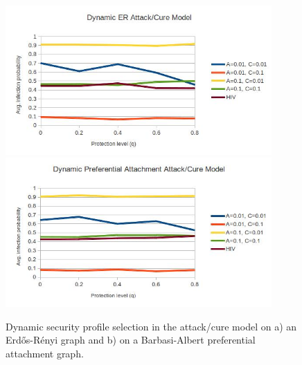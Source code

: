 \documentclass{article}
\theoremstyle{plain}
\begin{document}
\begin{figure}[h!]
  \centering
  \includegraphics[width=4in]{dynamic_er_attack_cure_model.jpg}
  \includegraphics[width=4in]{dynamic_preferential_attachment_attack_cure_model.jpg}
  \caption{Dynamic security profile selection in the attack/cure model on a) an Erd\H{o}s-R\'{e}nyi graph and b) on a Barbasi-Albert preferential attachment graph.}
  \label{fig:attack_cure}
\end{figure}
\end{document}
